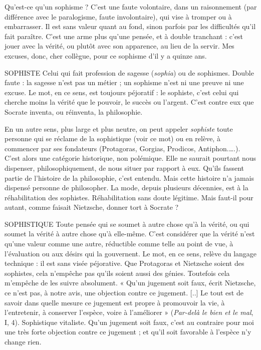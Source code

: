 Qu'est-ce qu’un sophisme ? C’est une faute volontaire, dans un raisonnement
(par différence avec le paralogisme, faute involontaire), qui vise à
tromper ou à embarrasser. Il est sans valeur quant au fond, sinon parfois par
les difficultés qu’il fait paraître. C’est une arme plus qu’une pensée, et à
double tranchant : c’est jouer avec la vérité, ou plutôt avec son apparence, au
lieu de la servir. Mes excuses, donc, cher collègue, pour ce sophisme d'il y a
quinze ans.

SOPHISTE Celui qui fait profession de sagesse ({\it sophia}) ou de sophismes.
Double faute : la sagesse n’est pas un métier ; un sophisme n’est
ni une preuve ni une excuse. Le mot, en ce sens, est toujours péjoratif : le
sophiste, c’est celui qui cherche moins la vérité que le pouvoir, le succès ou
l'argent. C’est contre eux que Socrate inventa, ou réinventa, la philosophie.

En un autre sens, plus large et plus neutre, on peut appeler {\it sophiste} toute
personne qui se réclame de la sophistique (voir ce mot) ou en relève, à commencer
par ses fondateurs (Protagoras, Gorgias, Prodicos, Antiphon.….).
C’est alors une catégorie historique, non polémique. Elle ne saurait pourtant
nous dispenser, philosophiquement, de nous situer par rapport à eux. Qu'ils
fassent partie de l’histoire de la philosophie, c’est entendu. Mais cette histoire
n’a jamais dispensé personne de philosopher. La mode, depuis plusieurs
décennies, est à la réhabilitation des sophistes. Réhabilitation sans doute
légitime. Mais faut-il pour autant, comme faisait Nietzsche, donner tort à
Socrate ?

SOPHISTIQUE Toute pensée qui se soumet à autre chose qu’à la vérité, ou
qui soumet la vérité à autre chose qu’à elle-même. C'est
considérer que la vérité n’est qu’une valeur comme une autre, réductible
comme telle au point de vue, à l'évaluation ou aux désirs qui la gouvernent. Le
mot, en ce sens, relève du langage technique : il est sans visée péjorative. Que
Protagoras et Nietzsche soient des sophistes, cela n’empêche pas qu'ils soient
aussi des génies. Toutefois cela m’empêche de les suivre absolument. « Qu'un
jugement soit faux, écrit Nietzsche, ce n’est pas, à notre avis, une objection
contre ce jugement. [..] Le tout est de savoir dans quelle mesure ce jugement
est propre à promouvoir la vie, à l’entretenir, à conserver l'espèce, voire à
l'améliorer » ({\it Par-delà le bien et le mal}, I, 4). Sophistique vitaliste. Qu’un jugement
soit faux, c’est au contraire pour moi une très forte objection contre ce
jugement ; et qu’il soit favorable à l’espèce n’y change rien.

